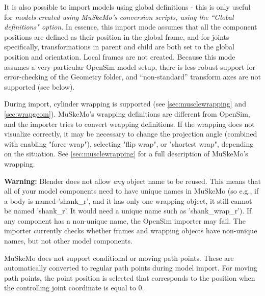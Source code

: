\documentclass{article}
\begin{document}
It is also possible to import models using global definitions - this is only useful for \textit{models created using MuSkeMo's conversion scripts, using the ``Global definitions" option}. In essence, this import mode assumes that all the component positions are defined as their position in the global frame, and for joints specifically, transformations in parent and child are both set to the global position and orientation. Local frames are not created. Because this mode assumes a very particular OpenSim model setup, there is less robust support for error-checking of the Geometry folder, and ``non-standard'' transform axes are not supported (see below).

During import, cylinder wrapping is supported (see \ref{sec:musclewrapping} and \ref{sec:wrapgeom}). MuSkeMo's wrapping definitions are different from OpenSim, and the importer tries to convert wrapping definitions. If the wrapping does not visualize correctly, it may be necessary to change the projection angle (combined with enabling "force wrap"), selecting "flip wrap", or "shortest wrap", depending on the situation. See \ref{sec:musclewrapping} for a full description of MuSkeMo's wrapping.

\textbf{Warning:} Blender does not allow \textit{any} object name to be reused. This means that all of your model components need to have unique names in MuSkeMo (so e.g., if a body is named 'shank\_r', and it has only one wrapping object, it still cannot be named 'shank\_r'. It would need a unique name such as 'shank\_wrap\_r'). If any component has a non-unique name, the OpenSim importer may fail. The importer currently checks whether frames and wrapping objects have non-unique names, but not other model components.

MuSkeMo does not support conditional or moving path points. These are automatically converted to regular path points during model import. For moving path points, the point position is selected that corresponds to the position when the controlling joint coordinate is equal to 0.
\end{document}
